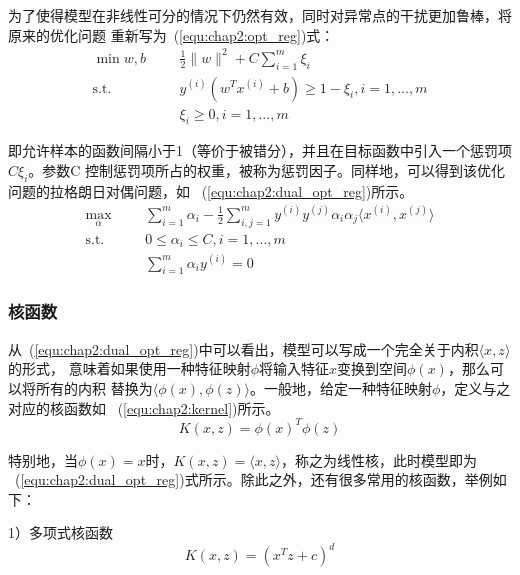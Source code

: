 为了使得模型在非线性可分的情况下仍然有效，同时对异常点的干扰更加鲁棒，将原来的优化问题
重新写为~(\ref{equ:chap2:opt_reg})式：
\begin{equation}
  \label{equ:chap2:opt_reg}
  \begin{aligned}
    \min{w,b} &
    & & \frac{1}{2}\|w\|^2+C\sum_{i=1}^m\xi_i \\
    \text{s.t.} &
    & & y^{(i)}\left(w^Tx^{(i)}+b\right)\geq 1-\xi_i, i=1,...,m \\
    \quad &
    & & \xi_i \geq 0, i=1,...,m
  \end{aligned}
\end{equation}

即允许样本的函数间隔小于1（等价于被错分），并且在目标函数中引入一个惩罚项$C\xi_i$。参数C
控制惩罚项所占的权重，被称为惩罚因子。同样地，可以得到该优化问题的拉格朗日对偶问题，如
~(\ref{equ:chap2:dual_opt_reg})所示。
\begin{equation}
  \label{equ:chap2:dual_opt_reg}
  \begin{aligned}
    \max_{\alpha} &
    & & \sum_{i=1}^m\alpha_i-\frac{1}{2}\sum_{i,j=1}^m
    y^{(i)}y^{(j)}\alpha_i\alpha_j\langle x^{(i)},x^{(j)}\rangle\\
    \text{s.t.} &
    & & 0\leq\alpha_i\leq C, i=1,...,m \\
    \quad &
    & & \sum_{i=1}^m\alpha_iy^{(i)}=0
  \end{aligned}
\end{equation}

\subsubsection{核函数}

从~(\ref{equ:chap2:dual_opt_reg})中可以看出，模型可以写成一个完全关于内积$\langle x,z\rangle$的形式，
意味着如果使用一种特征映射$\phi$将输入特征$x$变换到空间$\phi(x)$，那么可以将所有的内积
替换为$\langle\phi(x),\phi(z)\rangle$。一般地，给定一种特征映射$\phi$，定义与之对应的核函数如
~(\ref{equ:chap2:kernel})所示。
\begin{equation}
  \label{equ:chap2:kernel}
  K(x,z)=\phi(x)^T\phi(z)
\end{equation}

特别地，当$\phi(x)=x$时，$K(x,z)=\langle x,z\rangle$，称之为线性核，此时模型即为
~(\ref{equ:chap2:dual_opt_reg})式所示。除此之外，还有很多常用的核函数，举例如下：

1）多项式核函数
\begin{equation}
  \label{equ:chap2:polynomial_kernel}
  K(x,z)=(x^Tz+c)^d
\end{equation}

